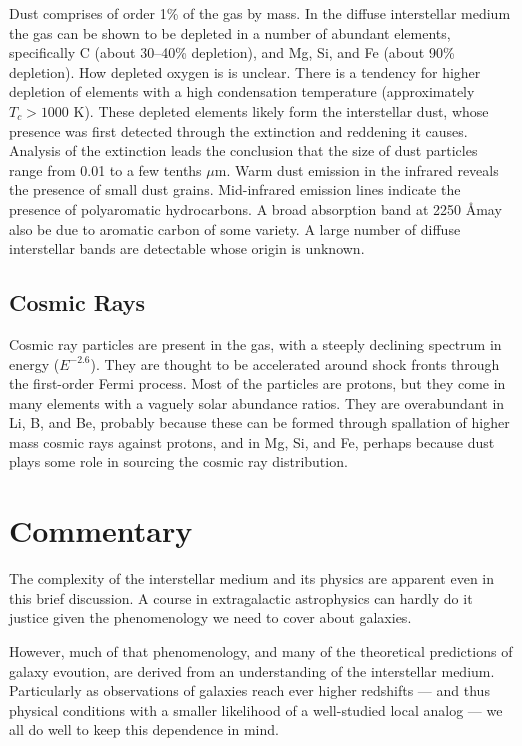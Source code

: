 Dust comprises of order 1\% of the gas by mass. In the diffuse
interstellar medium the gas can be shown to be depleted in a number of
abundant elements, specifically C (about 30--40\% depletion), and Mg,
Si, and Fe (about 90\% depletion). How depleted oxygen is is unclear.
There is a tendency for higher depletion of elements with a high
condensation temperature (approximately $T_c>1000$ K). These depleted
elements likely form the interstellar dust, whose presence was first
detected through the extinction and reddening it causes. Analysis of
the extinction leads the conclusion that the size of dust particles
range from 0.01 to a few tenths $\mu$m. Warm dust emission in the
infrared reveals the presence of small dust grains. Mid-infrared
emission lines indicate the presence of polyaromatic hydrocarbons. A
broad absorption band at 2250 \AA may also be due to aromatic carbon
of some variety. A large number of diffuse interstellar bands are
detectable whose origin is unknown.

\subsection{Cosmic Rays}

Cosmic ray particles are present in the gas, with a steeply declining
spectrum in energy ($E^{-2.6}$). They are thought to be accelerated
around shock fronts through the first-order Fermi process. Most of the
particles are protons, but they come in many elements with a vaguely
solar abundance ratios. They are overabundant in Li, B, and Be,
probably because these can be formed through spallation of higher mass
cosmic rays against protons, and in Mg, Si, and Fe, perhaps because
dust plays some role in sourcing the cosmic ray distribution.

\section{Commentary}

The complexity of the interstellar medium and its physics are apparent
even in this brief discussion. A course in extragalactic astrophysics
can hardly do it justice given the phenomenology we need to cover
about galaxies. 

However, much of that phenomenology, and many of the theoretical
predictions of galaxy evoution, are derived from an understanding of
the interstellar medium. Particularly as observations of galaxies
reach ever higher redshifts --- and thus physical conditions with a
smaller likelihood of a well-studied local analog --- we all do well
to keep this dependence in mind.


